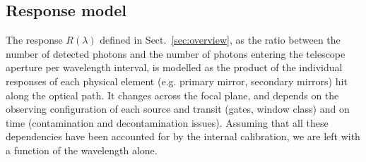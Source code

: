 \documentclass{aa}
\newcommand{\secname}{Sect.}
\newcommand{\secref}[1]{\secname~\ref{sec:#1}}
\begin{document}
\subsection{Response model}

The response $R(\lambda)$  defined in \secref{overview}, as the ratio between the number of detected photons and the number of photons entering the telescope aperture per wavelength interval, is modelled as the product of the individual responses of each physical element (e.g. primary mirror, secondary mirrors) hit along the optical path. It changes across the focal plane, and depends on the observing configuration of each source and transit (gates, window class) and on time (contamination and decontamination issues). Assuming that all these dependencies have been accounted for by the internal calibration, we are left with a function of the wavelength alone. 
\end{document}
